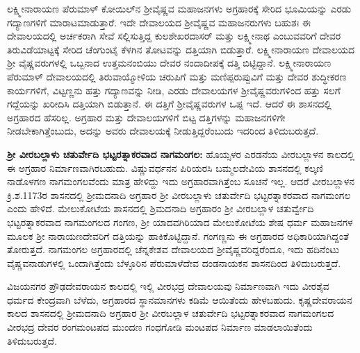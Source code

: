 ಲಕ್ಷ್ಮೀನಾರಾಯಣ ಪೆರುಮಾಳ್​ ಕೋಯಿಲ್​ನ ಶ‍್ರೀವೈಷ್ಣವ ಮಹಾಜನಗಳು ಅಗ್ರಹಾರಕ್ಕೆ ಸೇರಿದ ಭೂಮಿಯನ್ನು ಎರಡು ಗದ್ಯಾಣಗಳಿಗೆ ಮಾರಾಟಮಾಡುತ್ತಾರೆ. ಇದೇ ದೇವಾಲಯದ ಶ‍್ರೀವೈಷ್ಣವ ಮಹಾಜನರುಗಳು ಬಹುಶಃ ಈ ದೇವಾಲಯದಲ್ಲಿ ಅರ್ಚಕರಾಗಿ ಸೇವೆ ಸಲ್ಲಿಸುತ್ತಿದ್ದ ಕುಲಶೇಖರದಾಸರ್​ ಮತ್ತು ಲಕ್ಷ್ಮೀನಾಥ ಎಂಬುವವರಿಗೆ ದೇವರ ತಿರುವಿಡೆಯಾಟ್ಟಕ್ಕೆ ಸೇರಿದ ಚೆಂಗುಂಟೈ ಕೆಳಗಿನ ತೋಟವನ್ನು ದತ್ತಿಯಾಗಿ ಬಿಡುತ್ತಾರೆ. ಲಕ್ಷ್ಮೀನಾರಾಯಣ ದೇವಾಲಯದ ಶ‍್ರೀ ವೈಷ್ಣವರುಗಳಲ್ಲಿ ಒಬ್ಬನಾದ ಉತ್ತಮನಂಬಿಯು ದೇವರ ನಂದಾದೀಪಕ್ಕೆ ದತ್ತಿ ಬಿಟ್ಟಿದ್ದಾನೆ. ಲಕ್ಷ್ಮೀನಾರಾಯಣ ಪೆರುಮಾಳ್​ ದೇವಾಲಯದಲ್ಲಿ ತಿರುವಾಯ್ಮೋಳಿಯ ಚರುಪಿಗೆ ಮತ್ತು ಮಣಿಪ್ಪರುಪ್ಪುವಿಗೆ ಮತ್ತು ದೇವರ ಶುದ್ಧೀಕರಣ ಕಾರ್ಯಗಳಿಗೆ, ವಿಟ್ಟಣ್ಣನು ಹತ್ತು ಗದ್ಯಾಣವನ್ನು ನೀಡಿ, ಎರಡು ದೇವಾಲಯಗಳ ಶ‍್ರೀವೈಷ್ಣವರುಗಳಿಂದ ಹತ್ತು ಸಲಗೆ ಗದ್ದೆಯನ್ನು ಖರೀದಿಸಿ ದತ್ತಿಯಾಗಿ ಬಿಡುತ್ತಾನೆ. ಈ ದತ್ತಿಗೆ ಶ‍್ರೀವೈಷ್ಣವರುಗಳ ಒಪ್ಪ ಇದೆ. ಆದರೆ ಈ ಶಾಸನದಲ್ಲಿ ಅಗ್ರಹಾರದ ಹೆಸರಿಲ್ಲ. ಅಗ್ರಹಾರ ಮತ್ತು ದೇವಾಲಯಗಳಿಗೆ ಬಿಟ್ಟ ದತ್ತಿಗಳನ್ನು ಮಹಾಜನಗಳಿಗೇ ನೀಡಬೇಕಾಗಿತ್ತೆಂಬುದು, ಅದನ್ನು ಅವರು ದೇವಾಲಯಕ್ಕೆ ನೀಡುತ್ತಿದ್ದರೆಂಬುದು ಇದರಿಂದ ತಿಳಿದುಬರುತ್ತದೆ.

\textbf{ಶ‍್ರೀ ವೀರಬಲ್ಲಾಳು ಚತುರ್ವೇದಿ ಭಟ್ಟರತ್ನಾಕರವಾದ ನಾಗಮಂಗಲ:} ಹೊಯ್ಸಳರ ಎರಡನೆಯ ವೀರಬಲ್ಲಾಳನ ಕಾಲದಲ್ಲಿ ಈ ಅಗ್ರಹಾರ ನಿರ್ಮಾಣವಾಗಿರಬಹುದು. ವಿಷ್ಣುವರ್ಧನನ ಪಿರಿಯರಸಿ ಬಮ್ಮಲದೇವಿಯ ಶಾಸನದಲ್ಲಿ ಕಲ್ಕಣಿ ನಾಡೊಳಗಣ ನಾಗಮಂಗಲವೆಂದು ಮಾತ್ರ ಹೇಳಿದ್ದು ಇದು ಅಗ್ರಹಾರವಾಗಿತ್ತೆಂಬ ಸೂಚನೆ ಇಲ್ಲ. ಆದರೆ ವೀರಬಲ್ಲಾಳನ ಕ್ರಿ.ಶ.1173ರ ಶಾಸನದಲ್ಲಿ ಶ‍್ರೀಮದನಾದಿ ಅಗ್ರಹಾರ ಶ‍್ರೀ ವೀರಬಲ್ಲಾಳು ಚತುರ್ವೇದಿ ಭಟ್ಟರತ್ನಾಕರವಾದ ನಾಗಮಂಗಲ ಎಂದು ಹೇಳಿದೆ. ಮೇಲುಕೋಟೆಯ ಶಾಸನದಲ್ಲಿ ಶ್ರಿಮದನಾದಿ ಅಗ್ರಹಾರಂ ಶ‍್ರೀ ವೀರಬಲ್ಲಾಳ ಚತುರ್ವ್ವೇದಿ ಭಟ್ಟರತ್ನಾಕರವಾದ ನಾಗಮಂಗಲದ ಗಂಗಣ, ಶ‍್ರೀ ಯಾದವಗಿರಿಯಾದ ಮೇಲುಕೋಟೆಯ ಶೇಷ ಧರ್ಮ ಮಹಾಜನಗಳ ಮೂಲಕ ಶ‍್ರೀ ನಾರಾಯಣದೇವರಿಗೆ ದತ್ತಿಯನ್ನು ಹಾಕಿಕೊಟ್ಟಿದ್ದಾನೆ. ಗಂಗಣ್ಣನು ಈ ಅಗ್ರಹಾರದ ಅಧಿಕಾರಿಯಾಗಿದ್ದಂತೆ ತೋರುತ್ತದೆ. ನಾಗಮಂಗಲ ಅಗ್ರಹಾರದಲ್ಲಿ ಚೆನ್ನಕೇಶವ ದೇವಾಲಯದ ಶ‍್ರೀವೈಷ್ಣವರಿದ್ದರೆಂದೂ, ಇದು ಹದಿನೆಂಟು ವೈಷ್ಣವನಾಡುಗಳಲ್ಲಿ ಒಂದಾಗಿತ್ತೆಂದು ಬೆಳ್ಳೂರಿನ ಪೆರುಮಾಳೆದೇವ ದಂಡನಾಯಕನ ಶಾಸನದಿಂದ ತಿಳಿದುಬರುತ್ತದೆ.

ವಿಜಯನಗರ ಪ್ರೌಢದೇವರಾಯನ ಕಾಲದಲ್ಲಿ ಇಲ್ಲಿ ವೀರಭದ್ರ ದೇವಾಲಯವು ನಿರ್ಮಾಣವಾಗಿ ಇದು ವೀರಶೈವ ಧರ್ಮದ ಕೇಂದ್ರವಾಗಿ ಬೆಳೆದು, ಅಗ್ರಹಾರದ ಸ್ಥಾನಮಾನಗಳು ಕಡಿಮೆ ಆಯಿತೆಂದು ಹೇಳಬಹುದು. ಕೃಷ್ಣದೇವರಾಯನ ಕಾಲದ ಶಾಸನದಲ್ಲಿ ಶ‍್ರೀಮದನಾದಿ ಅಗ್ರಹಾರ ಶ‍್ರೀ ವೀರಬಲ್ಲಾಳ ಚತುರ್ವೇದಿ ಭಟ್ಟರತ್ನಾಕರವಾದ ನಾಗಮಂಗಲದ ವೀರಭದ್ರ ದೇವರ ರಂಗಮಂಟಪದ ಮುಂದಣ ಗಂಧಗೋಡಿ ಮಂಟಪದ ನಿರ್ಮಾಣ ಮಾಡಲಾಯಿತೆಂದು ತಿಳಿದುಬರುತ್ತದೆ.

